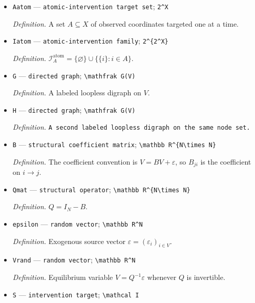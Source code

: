 \documentclass{article}
\begin{document}
\begin{itemize}
  \item \texttt{Aatom} --- \texttt{atomic-\allowbreak{}intervention target set}; \texttt{2\textasciicircum{}X}
  \par\smallskip\noindent\emph{Definition.} A set \(A\subseteq X\) of observed coordinates targeted one at a time.
  \item \texttt{Iatom} --- \texttt{atomic-\allowbreak{}intervention family}; \texttt{2\textasciicircum{}\{2\textasciicircum{}X\}\allowbreak{}}
  \par\smallskip\noindent\emph{Definition.} \(\mathcal I_A^{\mathrm{atom}}=\{\varnothing\}\cup\{\{i\}:i\in A\}\).
  \item \texttt{G} --- \texttt{directed graph}; \texttt{\textbackslash{}\allowbreak{}mathfrak G(V)}
  \par\smallskip\noindent\emph{Definition.} A labeled loopless digraph on \(V\).
  \item \texttt{H} --- \texttt{directed graph}; \texttt{\textbackslash{}\allowbreak{}mathfrak G(V)}
  \par\smallskip\noindent\emph{Definition.} \texttt{A second labeled loopless digraph on the same node set.}
  \item \texttt{B} --- \texttt{structural coefficient matrix}; \texttt{\textbackslash{}\allowbreak{}mathbb R\textasciicircum{}\{N\textbackslash{}\allowbreak{}times N\}\allowbreak{}}
  \par\smallskip\noindent\emph{Definition.} The coefficient convention is \(V=BV+\varepsilon\), so \(B_{ji}\) is the coefficient on \(i\to j\).
  \item \texttt{Qmat} --- \texttt{structural operator}; \texttt{\textbackslash{}\allowbreak{}mathbb R\textasciicircum{}\{N\textbackslash{}\allowbreak{}times N\}\allowbreak{}}
  \par\smallskip\noindent\emph{Definition.} \(Q=I_N-B\).
  \item \texttt{epsilon} --- \texttt{random vector}; \texttt{\textbackslash{}\allowbreak{}mathbb R\textasciicircum{}N}
  \par\smallskip\noindent\emph{Definition.} Exogenous source vector \(\varepsilon=(\varepsilon_i)_{i\in V}\).
  \item \texttt{Vrand} --- \texttt{random vector}; \texttt{\textbackslash{}\allowbreak{}mathbb R\textasciicircum{}N}
  \par\smallskip\noindent\emph{Definition.} Equilibrium variable \(V=Q^{-1}\varepsilon\) whenever \(Q\) is invertible.
  \item \texttt{S} --- \texttt{intervention target}; \texttt{\textbackslash{}\allowbreak{}mathcal I}

\end{itemize}
\end{document}
